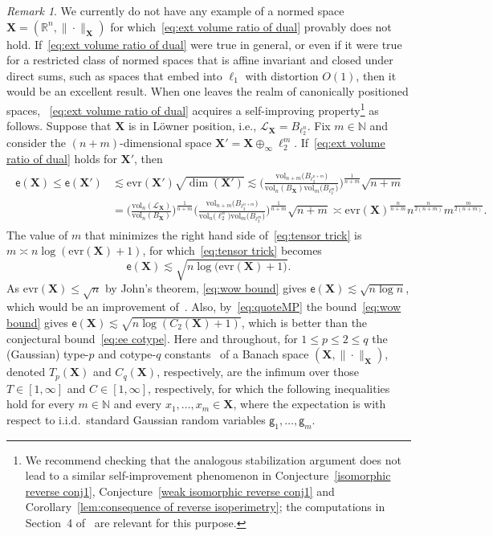 \documentclass[11pt,reqno]{amsart}
\renewcommand{\le}{\leqslant}
\newcommand{\evr}{\mathrm{evr}}
\newcommand{\X}{\mathbf X}
\newcommand{\R}{\mathbb R}
\theoremstyle{remark}
\newtheorem{remark}[theorem]{Remark}
\newcommand{\N}{\mathbb N}
\newcommand{\ee}{\mathsf{e}}
\newcommand{\vol}{\mathrm{vol}}
\renewcommand{\1}{\mathbf 1}
\newcommand{\g}{\mathsf{g}}
\begin{document}
\begin{remark}\label{rem:stabilization} We currently do not have any example of a normed space $\X=(\R^n,\|\cdot\|_\X)$ for which~\eqref{eq:ext volume ratio of dual}  provably does not hold. If~\eqref{eq:ext volume ratio of dual}  were true in general, or even if it were true for a restricted class of normed spaces that is affine invariant and closed under direct sums, such as  spaces that embed into $\ell_1$ with distortion $O(1)$, then it would be an excellent result. When one leaves the realm of canonically positioned spaces, ~\eqref{eq:ext volume ratio of dual}   acquires  a self-improving property\footnote{We recommend checking that the analogous stabilization argument does not lead to a similar self-improvement phenomenon in Conjecture~\ref{isomorphic reverse conj1},  Conjecture~\ref{weak isomorphic reverse conj1} and Corollary~\ref{lem:consequence of reverse isoperimetry}; the computations in Section~4 of~\cite{MPS12} are relevant for this purpose.}  as follows. Suppose that $\X$ is in L\"owner position, i.e., $\mathscr{L}_\X=B_{\ell_2^n}$. Fix $m\in \N$ and consider the $(n+m)$-dimensional space $\X'=\X\oplus_\infty \ell_2^m$. If~\eqref{eq:ext volume ratio of dual} holds for $\X'$, then
\begin{align}\label{eq:tensor trick}
\begin{split}
\ee(\X)\le \ee(\X')&\lesssim  \evr(\X')\sqrt{\dim(\X')}\lesssim \Bigg(\frac{\vol_{n+m}\big(B_{\ell_2^{n+m}}\big)}{\vol_n(B_\X)\vol_m\big(B_{\ell_2^m}\big)}\Bigg)^{\frac{1}{n+m}} \sqrt{n+m}
\\ &=\bigg(\frac{\vol_n(\mathscr{L}_\X)}{\vol_n(B_\X)}\bigg)^{\frac{1}{n+m}}
 \Bigg(\frac{\vol_{n+m}\big(B_{\ell_2^{n+m}}\big)}{\vol_n\big(\ell_2^n\big)\vol_m\big(B_{\ell_2^m}\big)}\Bigg)^{\frac{1}{n+m}}\sqrt{n+m}\asymp \evr(\X)^{\frac{n}{n+m}} n^{\frac{n}{2(n+m)}}m^{\frac{m}{2(n+m)}}.
\end{split}
 \end{align}
 The value of $m$ that minimizes the right hand side of~\eqref{eq:tensor trick} is $m\asymp n\log(\evr(\X)+1)$, for which~\eqref{eq:tensor trick} becomes
 \begin{equation}\label{eq:wow bound}
 \ee(\X)\lesssim \sqrt{n\log\big(\evr(\X)+1\big)}.
 \end{equation}
As $\evr(\X)\le \sqrt{n}$ by John's theorem, \eqref{eq:wow bound} gives $\ee(\X)\lesssim \sqrt{n\log n}$, which would be an improvement of~\cite{JLS86}.  Also, by~\eqref{eq:quoteMP} the bound~\eqref{eq:wow bound} gives $\ee(\X)\lesssim \sqrt{n\log(C_2(\X)+1)}$, which is better than the conjectural bound~\eqref{eq:ee cotype}. Here and throughout, for $1\le p\le 2\le q$ the (Gaussian) type-$p$ and cotype-$q$ constants~\cite{MP76} of a Banach space $(\X,\|\cdot\|_{\X})$, denoted $T_p(\X)$ and $C_q(\X)$, respectively, are the infimum over those $T\in [1,\infty]$ and $C\in [1,\infty]$, respectively, for which the following inequalities hold for every $m\in \N$ and every  $x_1,\ldots,x_m\in \X$, where the expectation is with respect to i.i.d.~standard Gaussian random variables $\g_1,\ldots,\g_m$.

\end{remark}
\end{document}
